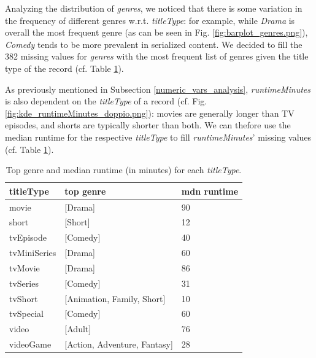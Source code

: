 Analyzing the distribution of \textit{genres}, we noticed that there is some variation in the frequency of different genres w.r.t. \textit{titleType}: for example, while \emph{Drama} is overall the most frequent genre (as can be seen in Fig. \ref{fig:barplot_genres.png}), \emph{Comedy} tends to be more prevalent in serialized content. We decided to fill the 382 missing values for \textit{genres} with the most frequent list of genres given the title type of the record (cf. Table \ref{tab:top_genre_median_runtime}).

As previously mentioned in Subsection \ref{numeric_vars_analysis}, \textit{runtimeMinutes} is also dependent on the \textit{titleType} of a record (cf. Fig. \ref{fig:kde_runtimeMinutes_doppio.png}): movies are generally longer than TV episodes, and shorts are typically shorter than both. We can thefore use the median runtime for the respective \textit{titleType} to fill \textit{runtimeMinutes}' missing values (cf. Table \ref{tab:top_genre_median_runtime}).

\begin{table}[h]
    \centering
    \small
    \setlength{\tabcolsep}{3.5pt}
    \renewcommand{\arraystretch}{0.9}
    \begin{tabular}{lp{3.9cm}p{1.2cm}}
    \toprule
    \textbf{titleType} & \textbf{top genre} & \textbf{mdn runtime} \\
    \midrule
    movie          & [Drama]                     & 90          \\
    short          & [Short]                   & 12          \\
    tvEpisode      & [Comedy]                    & 40          \\
    tvMiniSeries   & [Drama]                     & 60          \\
    tvMovie        & [Drama]                     & 86          \\
    tvSeries       & [Comedy]                    & 31          \\
    tvShort        & [Animation, Family, Short]  & 10          \\
    tvSpecial      & [Comedy]                    & 60          \\
    video          & [Adult]                     & 76          \\
    videoGame      & [Action, Adventure, Fantasy]& 28          \\
    \bottomrule
    \end{tabular}
    \caption{Top genre and median runtime (in minutes) for each \textit{titleType}.}
    \label{tab:top_genre_median_runtime}
\end{table}

